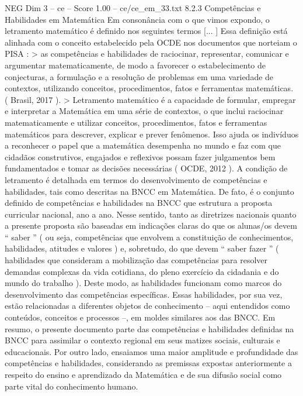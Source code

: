\begin{textsample}{NEG Dim 3 – ce – Score 1.00 – ce/ce\_em\_33.txt}  \label{ex:f3_neg_236}
8.2.3 Competências e Habilidades em Matemática Em consonância com o que vimos expondo, o letramento matemático é definido nos seguintes termos [... ] Essa definição está alinhada com o conceito estabelecido pela OCDE nos documentos que norteiam o PISA : > as competências e habilidades de raciocinar, representar, comunicar e argumentar matematicamente, de modo a favorecer o estabelecimento de conjecturas, a formulação e a resolução de problemas em uma variedade de contextos, utilizando conceitos, procedimentos, fatos e ferramentas matemáticas. ( Brasil, 2017 ). > Letramento matemático é a capacidade de formular, empregar e interpretar a Matemática em uma série de contextos, o que inclui raciocinar matematicamente e utilizar conceitos, procedimentos, fatos e ferramentas matemáticos para descrever, explicar e prever fenômenos.
Isso ajuda os indivíduos a reconhecer o papel que a matemática desempenha no mundo e faz com que cidadãos construtivos, engajados e reflexivos possam fazer julgamentos bem fundamentados e tomar as decisões necessárias ( OCDE, 2012 ).
A condição de letramento é detalhada em termos do desenvolvimento de competências e habilidades, tais como descritas na BNCC em Matemática.
De fato, é o conjunto definido de competências e habilidades na BNCC que estrutura a proposta curricular nacional, ano a ano.
Nesse sentido, tanto as diretrizes nacionais quanto a presente proposta são baseadas em indicações claras do que os alunas/os devem “ saber ” ( ou seja, competências que envolvem a constituição de conhecimentos, habilidades, atitudes e valores ) e, sobretudo, do que devem “ saber fazer ” ( habilidades que consideram a mobilização das competências para resolver demandas complexas da vida cotidiana, do pleno exercício da cidadania e do mundo do trabalho ).
Deste modo, as habilidades funcionam como marcos do desenvolvimento das competências específicas.
Essas habilidades, por sua vez, estão relacionadas a diferentes objetos de conhecimento – aqui entendidos como conteúdos, conceitos e processos –, em moldes similares aos das BNCC.
Em resumo, o presente documento parte das competências e habilidades definidas na BNCC para assimilar o contexto regional em seus matizes sociais, culturais e educacionais.
Por outro lado, ensaiamos uma maior amplitude e profundidade das competências e habilidades, considerando as premissas expostas anteriormente a respeito do ensino e aprendizado da Matemática e de sua difusão social como parte vital do conhecimento humano.

\end{textsample}
